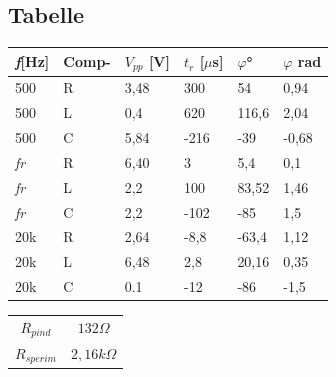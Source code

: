 \documentclass[12pt]{article}
\begin{document}
    \FloatBarrier
\subsection{Tabelle}    
\vspace{1cm}        

\begin{table}[!h]
        
            
        \begin{tabular}{|p{2cm}|p{2cm}|p{2cm}|p{2cm}|p{2cm}|p{2cm}|}
            \hline
            \rowcolor{nred} \textit{f}[Hz] & Comp- & $V_{pp}$ [V] & $t_r$ [$\mu$s] & $\varphi$° &  $\varphi$ rad\\
            \hline
            \rowcolor{norange} 500 & R & 3,48 & 300 & 54 & 0,94\\
            \hline
            \rowcolor{norange} 500 & L & 0,4 & 620 & 116,6 & 2,04\\
            \hline
            \rowcolor{norange} 500 & C & 5,84 & -216 & -39 & -0,68\\
            \hline
            \rowcolor{nyellow} \textit{fr} & R & 6,40 & 3 & 5,4 & 0,1\\
            \hline
            \rowcolor{nyellow} \textit{fr} & L & 2,2 & 100 & 83,52 & 1,46\\
            \hline
            \rowcolor{nyellow} \textit{fr} & C & 2,2 & -102  & -85 & 1,5\\
            \hline
            \rowcolor{ngreen}  20k & R & 2,64 & -8,8 & -63,4 & 1,12\\
            \hline
            \rowcolor{ngreen} 20k & L & 6,48 & 2,8 & 20,16 &0,35\\
            \hline
            \rowcolor{ngreen} 20k & C & 0.1 & -12 & -86 & -1,5\\
            \hline
            
        \end{tabular}
        \vskip 0.2cm
        \centering
        \begin{tabular}{|c|c|}
            \hline
            \rowcolor{norange} $R_{pind}$ & $132 \Omega$\\
            \rowcolor{nyellow}  $R_{sperim}$ & $2,16 k\Omega$ \\
            \hline
            
        \end{tabular}
         
    \end{table}
   
\end{document}
